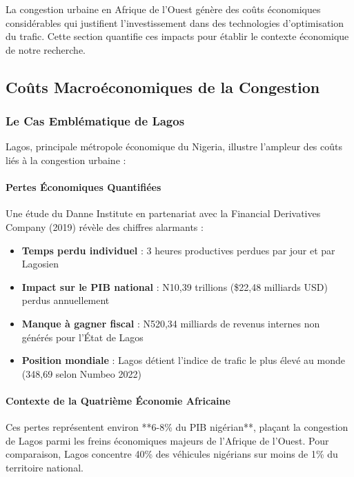 La congestion urbaine en Afrique de l'Ouest génère des coûts économiques considérables qui justifient l'investissement dans des technologies d'optimisation du trafic. Cette section quantifie ces impacts pour établir le contexte économique de notre recherche.

\subsection{Coûts Macroéconomiques de la Congestion}

\subsubsection{Le Cas Emblématique de Lagos}
Lagos, principale métropole économique du Nigeria, illustre l'ampleur des coûts liés à la congestion urbaine :

\paragraph{Pertes Économiques Quantifiées}
Une étude du Danne Institute en partenariat avec la Financial Derivatives Company (2019) \cite{dannelagos2019} révèle des chiffres alarmants :
\begin{itemize}
    \item \textbf{Temps perdu individuel} : 3 heures productives perdues par jour et par Lagosien
    \item \textbf{Impact sur le PIB national} : N10,39 trillions (\$22,48 milliards USD) perdus annuellement
    \item \textbf{Manque à gagner fiscal} : N520,34 milliards de revenus internes non générés pour l'État de Lagos
    \item \textbf{Position mondiale} : Lagos détient l'indice de trafic le plus élevé au monde (348,69 selon Numbeo 2022)
\end{itemize}

\paragraph{Contexte de la Quatrième Économie Africaine}
Ces pertes représentent environ **6-8\% du PIB nigérian**, plaçant la congestion de Lagos parmi les freins économiques majeurs de l'Afrique de l'Ouest. Pour comparaison, Lagos concentre 40\% des véhicules nigérians sur moins de 1\% du territoire national.

